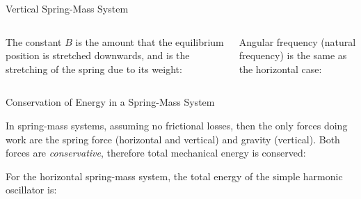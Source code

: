 \documentclass[12pt,compress,aspectratio=169]{beamer}
\begin{document}
\begin{frame}{Vertical Spring-Mass System}
  \vspace{.2in}
  \begin{columns}

    The constant $B$ is the amount that the equilibrium position is stretched
    downwards, and is the stretching of the spring due to its weight:
    

    Angular frequency (natural frequency) is the same as the horizontal case:

  \end{columns}
\end{frame}



\begin{frame}{Conservation of Energy in a Spring-Mass System}

  In spring-mass systems, assuming no frictional losses, then the only
  forces doing work are the spring force (horizontal and vertical) and gravity
  (vertical). Both forces are \emph{conservative}, therefore total mechanical
  energy is conserved:

  
  For the horizontal spring-mass system, the total energy of the simple harmonic
  oscillator is:
    
\end{frame}
\end{document}

